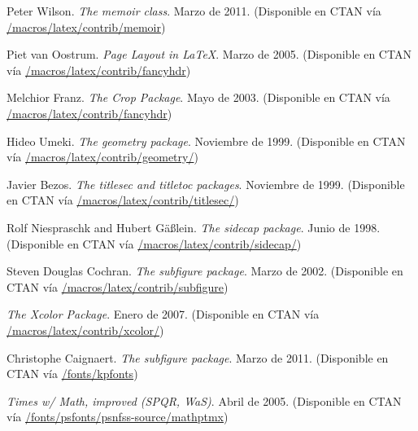 \documentclass[11pt,
              article,
              oneside
              ]{memoir}
\newcommand\CTANurl[1]{\url{#1}}
\begin{document}
\renewcommand*{\bibname}{Referencias}
\begin{thebibliography}{GMS94A}
\small

  Peter Wilson.
  \newblock \emph{The memoir class}.
  \newblock Marzo de 2011.
  \newblock (Disponible en CTAN vía
             \CTANurl{/macros/latex/contrib/memoir})

  Piet van Oostrum.
  \newblock \emph{Page Layout in LaTeX}.
  \newblock Marzo de 2005.
  \newblock (Disponible en CTAN vía
             \CTANurl{/macros/latex/contrib/fancyhdr})

  Melchior Franz.
  \newblock \emph{The Crop Package}.
  \newblock Mayo de 2003.
  \newblock (Disponible en CTAN vía
             \CTANurl{/macros/latex/contrib/fancyhdr})

  Hideo Umeki.
  \newblock \emph{The geometry package}.
  \newblock Noviembre de 1999.
  \newblock (Disponible en CTAN vía
            \CTANurl{/macros/latex/contrib/geometry/})

  Javier Bezos.
  \newblock \emph{The titlesec and titletoc packages}.
  \newblock Noviembre de 1999.
  \newblock (Disponible en CTAN vía
             \CTANurl{/macros/latex/contrib/titlesec/})

  Rolf Niespraschk and Hubert G\"{a}\ss{}lein.
  \newblock \emph{The sidecap package}.
  \newblock Junio de 1998.
  \newblock (Disponible en CTAN vía
            \CTANurl{/macros/latex/contrib/sidecap/})

  Steven Douglas Cochran.
  \newblock \emph{The subfigure package}.
  \newblock Marzo de 2002.
  \newblock (Disponible en CTAN vía
             \CTANurl{/macros/latex/contrib/subfigure})

  \newblock \emph{The Xcolor Package}.
  \newblock Enero de 2007.
  \newblock (Disponible en CTAN vía
             \CTANurl{/macros/latex/contrib/xcolor/})

  Christophe Caignaert.
  \newblock \emph{The subfigure package}.
  \newblock Marzo de 2011.
  \newblock (Disponible en CTAN vía
             \CTANurl{/fonts/kpfonts})

  \newblock \emph{Times w/ Math, improved (SPQR, WaS)}.
  \newblock Abril de 2005.
  \newblock (Disponible en CTAN vía
             \CTANurl{/fonts/psfonts/psnfss-source/mathptmx})


\end{thebibliography}
\end{document}
